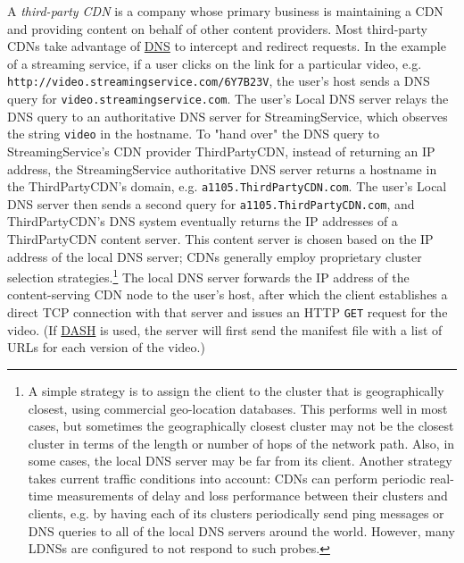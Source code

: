 \documentclass[table, xcdraw]{article}%
\begin{document}
A \emph{third-party CDN} is a company whose primary business is maintaining a CDN and providing content on behalf of other content providers. Most third-party CDNs take advantage of \hyperref[DNS]{DNS} to intercept and redirect requests. In the example of a streaming service, if a user clicks on the link for a particular video, e.g. \texttt{http://video.streamingservice.com/6Y7B23V}, the user’s host sends a DNS query for \texttt{video.streamingservice.com}. The user’s Local DNS server relays the DNS query to an authoritative DNS server for StreamingService, which observes the string \texttt{video} in the hostname. To "hand over" the DNS query to StreamingService's CDN provider ThirdPartyCDN, instead of returning an IP address, the StreamingService authoritative DNS server returns a hostname in the ThirdPartyCDN’s domain, e.g. \texttt{a1105.ThirdPartyCDN.com}. The user’s Local DNS server then sends a second query for \texttt{a1105.ThirdPartyCDN.com}, and ThirdPartyCDN’s DNS system eventually returns the IP addresses of a ThirdPartyCDN content server. This content server is chosen based on the IP address of the local DNS server; CDNs generally employ proprietary cluster selection strategies.\footnote{A simple strategy is to assign the client to the cluster that is geographically closest, using commercial geo-location databases. This performs well in most cases, but sometimes the geographically closest cluster may not be the closest cluster in terms of the length or number of hops of the network path. Also, in some cases, the local DNS server may be far from its client. Another strategy takes current traffic conditions into account: CDNs can perform periodic real-time measurements of delay and loss performance between their clusters and clients, e.g. by having each of its clusters periodically send ping messages or DNS queries to all of the local DNS servers around the world. However, many LDNSs are configured to not respond to such probes.} The local DNS server forwards the IP address of the content-serving CDN node to the user’s host, after which the client establishes a direct TCP connection with that server and issues an HTTP \texttt{GET} request for the video. (If \hyperref[DASH]{DASH} is used, the server will first send the manifest file with a list of URLs for each version of the video.)
\end{document}
